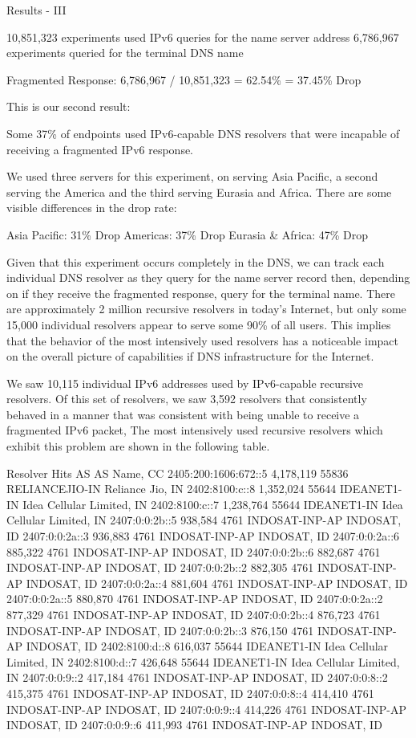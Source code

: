 Results - III 

10,851,323 experiments used IPv6 queries for the name server address
 6,786,967 experiments queried for the terminal DNS name

Fragmented Response: 6,786,967 / 10,851,323 = 62.54\% = 37.45\% Drop

This is our second result:

Some 37\% of endpoints used IPv6-capable DNS resolvers that were incapable of receiving a fragmented IPv6 response.

We used three servers for this experiment, on serving Asia Pacific, a second serving the America and the third serving Eurasia and Africa. There are some visible differences in the drop rate:

Asia Pacific: 31\% Drop
Americas: 37\% Drop
Eurasia \& Africa: 47\% Drop

Given that this experiment occurs completely in the DNS, we can track each individual DNS resolver as they query for the name server record then, depending on if they receive the fragmented response, query for the terminal name. There are approximately 2 million recursive resolvers in today’s Internet, but only some 15,000 individual resolvers appear to serve some 90\% of all users. This implies that the behavior of the most intensively used resolvers has a noticeable impact on the overall picture of capabilities if DNS infrastructure for the Internet.

We saw 10,115 individual IPv6 addresses used by IPv6-capable recursive resolvers. Of this set of resolvers, we saw 3,592 resolvers that consistently behaved in a manner that was consistent with being unable to receive a fragmented IPv6 packet, The most intensively used recursive resolvers which exhibit this problem are shown in the following table.

Resolver Hits  AS AS Name, CC
2405:200:1606:672::5    4,178,119      55836 RELIANCEJIO-IN Reliance Jio, IN
2402:8100:c::8 1,352,024   55644 IDEANET1-IN Idea Cellular Limited, IN
2402:8100:c::7 1,238,764   55644 IDEANET1-IN Idea Cellular Limited, IN
2407:0:0:2b::5 938,584  4761  INDOSAT-INP-AP INDOSAT, ID
2407:0:0:2a::3 936,883  4761  INDOSAT-INP-AP INDOSAT, ID
2407:0:0:2a::6 885,322  4761  INDOSAT-INP-AP INDOSAT, ID
2407:0:0:2b::6 882,687  4761  INDOSAT-INP-AP INDOSAT, ID
2407:0:0:2b::2 882,305  4761  INDOSAT-INP-AP INDOSAT, ID
2407:0:0:2a::4 881,604  4761  INDOSAT-INP-AP INDOSAT, ID
2407:0:0:2a::5 880,870  4761  INDOSAT-INP-AP INDOSAT, ID
2407:0:0:2a::2 877,329  4761  INDOSAT-INP-AP INDOSAT, ID
2407:0:0:2b::4 876,723  4761  INDOSAT-INP-AP INDOSAT, ID
2407:0:0:2b::3 876,150  4761  INDOSAT-INP-AP INDOSAT, ID
2402:8100:d::8 616,037  55644 IDEANET1-IN Idea Cellular Limited, IN
2402:8100:d::7 426,648  55644 IDEANET1-IN Idea Cellular Limited, IN
2407:0:0:9::2  417,184  4761  INDOSAT-INP-AP INDOSAT, ID
2407:0:0:8::2  415,375  4761  INDOSAT-INP-AP INDOSAT, ID
2407:0:0:8::4  414,410  4761  INDOSAT-INP-AP INDOSAT, ID
2407:0:0:9::4  414,226  4761  INDOSAT-INP-AP INDOSAT, ID
2407:0:0:9::6  411,993  4761  INDOSAT-INP-AP INDOSAT, ID

